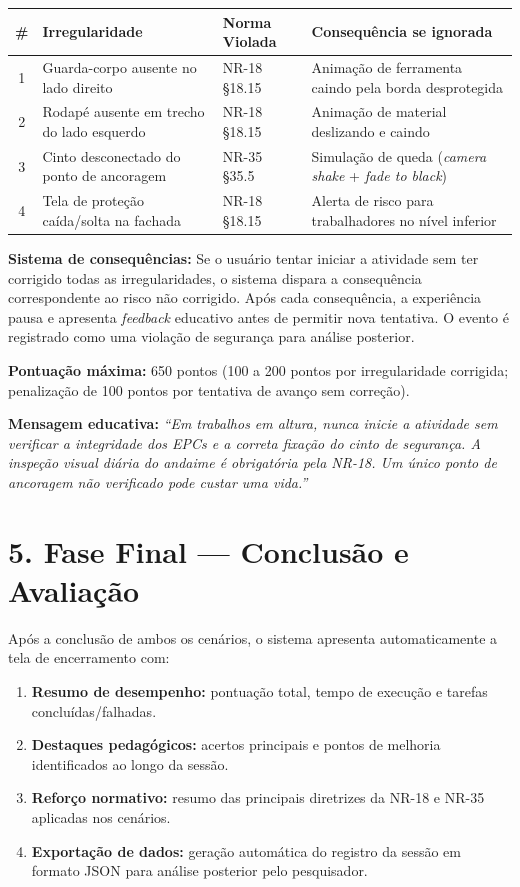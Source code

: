 \begin{table}[h]
\centering
\small
\begin{tabular}{clp{3.5cm}p{3cm}}
\hline
\textbf{\#} & \textbf{Irregularidade} & \textbf{Norma Violada} & \textbf{Consequência se ignorada} \\
\hline
1 & Guarda-corpo ausente no lado direito & NR-18 §18.15 & Animação de ferramenta caindo pela borda desprotegida \\
2 & Rodapé ausente em trecho do lado esquerdo & NR-18 §18.15 & Animação de material deslizando e caindo \\
3 & Cinto desconectado do ponto de ancoragem & NR-35 §35.5 & Simulação de queda (\textit{camera shake} + \textit{fade to black}) \\
4 & Tela de proteção caída/solta na fachada & NR-18 §18.15 & Alerta de risco para trabalhadores no nível inferior \\
\hline
\end{tabular}
\end{table}

\textbf{Sistema de consequências:} Se o usuário tentar iniciar a atividade sem ter corrigido todas as irregularidades, o sistema dispara a consequência correspondente ao risco não corrigido. Após cada consequência, a experiência pausa e apresenta \textit{feedback} educativo antes de permitir nova tentativa. O evento é registrado como uma violação de segurança para análise posterior.

\textbf{Pontuação máxima:} 650 pontos (100 a 200 pontos por irregularidade corrigida; penalização de 100 pontos por tentativa de avanço sem correção).

\textbf{Mensagem educativa:} \textit{``Em trabalhos em altura, nunca inicie a atividade sem verificar a integridade dos EPCs e a correta fixação do cinto de segurança. A inspeção visual diária do andaime é obrigatória pela NR-18. Um único ponto de ancoragem não verificado pode custar uma vida.''}

\section*{5. Fase Final --- Conclusão e Avaliação}

Após a conclusão de ambos os cenários, o sistema apresenta automaticamente a tela de encerramento com:

\begin{enumerate}
    \item \textbf{Resumo de desempenho:} pontuação total, tempo de execução e tarefas concluídas/falhadas.
    \item \textbf{Destaques pedagógicos:} acertos principais e pontos de melhoria identificados ao longo da sessão.
    \item \textbf{Reforço normativo:} resumo das principais diretrizes da NR-18 e NR-35 aplicadas nos cenários.
    \item \textbf{Exportação de dados:} geração automática do registro da sessão em formato \gls{JSON} para análise posterior pelo pesquisador.
\end{enumerate}

